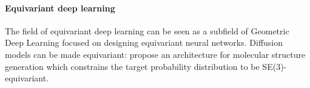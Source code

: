 \myline

\paragraph{Equivariant deep learning}
The field of equivariant deep learning can be seen as a subfield of Geometric Deep Learning focused on designing equivariant neural networks.
Diffusion models can be made equivariant: \cite{xu2026a} propose an architecture for molecular structure generation which constrains the target probability distribution to be SE(3)-equivariant.

